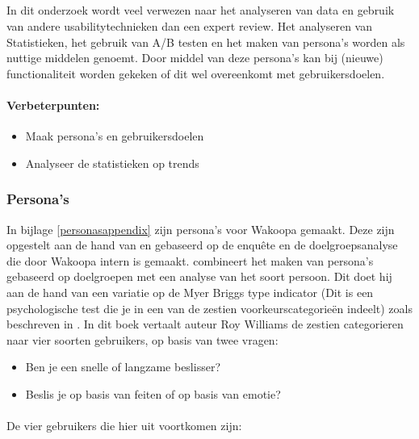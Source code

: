 \documentclass[a4paper, 10pt, pdftex]{report}
\begin{document}
    \subsection{\cite{Timmerman2008}}
    In dit onderzoek wordt veel verwezen naar het analyseren van data en gebruik van andere usabilitytechnieken dan een expert review. Het analyseren van Statistieken, het gebruik van A/B testen en het maken van persona's worden als nuttige middelen genoemt. Door middel van deze persona's kan bij (nieuwe) functionaliteit worden gekeken of dit wel overeenkomt met gebruikersdoelen.

    \paragraph{\textbf{Verbeterpunten:}}
      \begin{itemize}
        \item Maak persona's en gebruikersdoelen
        \item Analyseer de statistieken op trends
      \end{itemize}

    \subsubsection{Persona's}
      In bijlage \ref{personasappendix} zijn persona's voor Wakoopa gemaakt. Deze zijn opgestelt aan de hand van \cite{Klompsma} en gebaseerd op de enqu\^ete en de doelgroepsanalyse die door Wakoopa intern is gemaakt. \cite{Klompsma} combineert het maken van persona's gebaseerd op doelgroepen met een analyse van het soort persoon. Dit doet hij aan de hand van een variatie op de Myer Briggs type indicator (Dit is een psychologische test die je in een van de zestien voorkeurscategorie\"en indeelt) zoals beschreven in \cite{Williams}. In dit boek vertaalt auteur Roy Williams de zestien categorieren naar vier soorten gebruikers, op basis van twee vragen:
      \begin{itemize}
        \item Ben je een snelle of langzame beslisser?
        \item Beslis je op basis van feiten of op basis van emotie?
      \end{itemize}

      \paragraph{}De vier gebruikers die hier uit voortkomen zijn:
\end{document}
